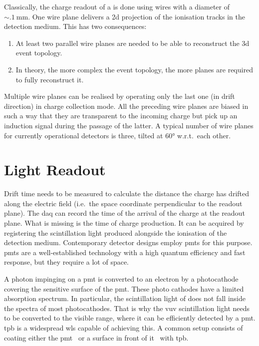 Classically, the charge readout of a \lartpc{} is done using wires with a diameter of $\sim{\SI{.1}{\milli\metre}}$.
One wire plane delivers a \gls{2d} projection of the ionisation tracks in the detection medium.
This has two consequences:
\begin{enumerate}
	\item At least two parallel wire planes are needed to be able to reconstruct the \gls{3d} event topology.
	\item In theory, the more complex the event topology, the more planes are required to fully reconstruct it.
\end{enumerate}
Multiple wire planes can be realised by operating only the last one (in drift direction) in charge collection mode.
All the preceding wire planes are biased in such a way that they are transparent to the incoming charge but pick up an induction signal during the passage of the latter.
A typical number of wire planes for currently operational detectors is three, tilted at \ang{60} w.r.t.\ each other.


\section{Light Readout}
\label{sec:lartpc_light-ro}

Drift time needs to be measured to calculate the distance the charge has drifted along the electric field (i.e.\ the space coordinate perpendicular to the readout plane).
The \gls{daq} can record the time of the arrival of the charge at the readout plane.
What is missing is the time of charge production.
It can be acquired by registering the scintillation light produced alongside the ionisation of the detection medium.
Contemporary detector designs employ \glspl{pmt} for this purpose.
\glspl{pmt} are a well-established technology with a high quantum efficiency and fast response, but they require a lot of space.

A photon impinging on a \gls{pmt} is converted to an electron by a photocathode covering the sensitive surface of the \gls{pmt}.
These photo cathodes have a limited absorption spectrum.
In particular, the scintillation light of \lar{} does not fall inside the spectra of most photocathodes.
That is why the \gls{vuv} scintillation light needs to be converted to the visible range, where it can be efficiently detected by a \gls{pmt}.
\gls{tpb} is a widespread \gls{wls} capable of achieving this.
A common setup consists of coating either the \gls{pmt}~\cite{icarus} or a surface in front of it~\cite{uboone} with \gls{tpb}.


